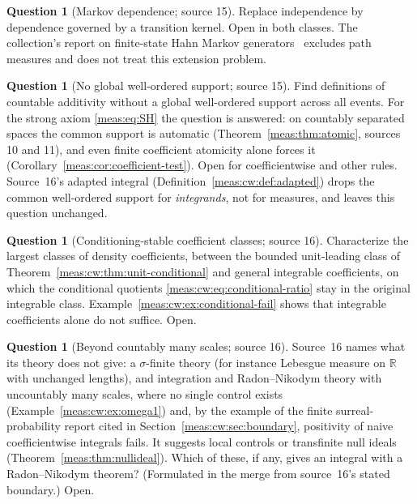 \documentclass[11pt]{article}
\numberwithin{equation}{section}
\theoremstyle{definition}
\newtheorem{question}[theorem]{Question}
\theoremstyle{remark}
\newcommand{\R}{\mathbb R}
\begin{document}
\begin{question}[Markov dependence; source 15]\label{meas:q:markov}
Replace independence by dependence governed by a transition kernel. Open in both
classes. The collection's report on finite-state Hahn Markov
generators~\cite{repomarkov} excludes path measures and does not treat this
extension problem.
\end{question}

\begin{question}[No global well-ordered support; source 15]\label{meas:q:global}
Find definitions of countable additivity without a global well-ordered support across
all events. For the strong axiom \eqref{meas:eq:SH} the question is answered: on
countably separated spaces the common support is automatic
(Theorem~\ref{meas:thm:atomic}, sources 10 and 11), and even finite coefficient
atomicity alone forces it (Corollary~\ref{meas:cor:coefficient-test}). Open for
coefficientwise and other rules. Source~16's adapted integral
(Definition~\ref{meas:cw:def:adapted}) drops the common well-ordered support for
\emph{integrands}, not for measures, and leaves this question unchanged.
\end{question}

\begin{question}[Conditioning-stable coefficient classes; source 16]
\label{meas:cw:q:conditional}
Characterize the largest classes of density coefficients, between the bounded
unit-leading class of Theorem~\ref{meas:cw:thm:unit-conditional} and general
integrable coefficients, on which the conditional quotients
\eqref{meas:cw:eq:conditional-ratio} stay in the original integrable class.
Example~\ref{meas:cw:ex:conditional-fail} shows that integrable coefficients alone
do not suffice. Open.
\end{question}

\begin{question}[Beyond countably many scales; source 16]
\label{meas:cw:q:uncountable}
Source~16 names what its theory does not give: a $\sigma$-finite theory (for instance
Lebesgue measure on $\R$ with unchanged lengths), and integration and
Radon--Nikodym theory with uncountably many scales, where no single control exists
(Example~\ref{meas:cw:ex:omega1}) and, by the example of the finite
surreal-probability report cited in Section~\ref{meas:cw:sec:boundary}, positivity of
naive coefficientwise integrals fails. It suggests local controls or transfinite
null ideals (Theorem~\ref{meas:thm:nullideal}). Which of these, if any, gives an
integral with a Radon--Nikodym theorem? (Formulated in the merge from source~16's
stated boundary.) Open.
\end{question}
\end{document}
